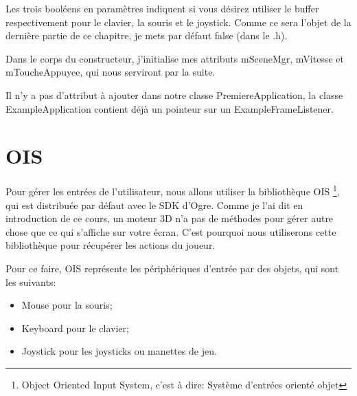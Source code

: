 Les trois bool\'eens en param\`etres indiquent si vous d\'esirez utiliser le buffer respectivement pour le clavier, la souris et le joystick. Comme ce sera l'objet de la derni\`ere partie de ce chapitre, je mets par d\'efaut false (dans le .h).

Dans le corps du constructeur, j'initialise mes attributs mSceneMgr, mVitesse et mToucheAppuyee, qui nous serviront par la suite.

Il n'y a pas d'attribut \`{a} ajouter dans notre classe PremiereApplication, la classe ExampleApplication contient d\'ej\`{a} un pointeur sur un ExampleFrameListener.

       




































\section{OIS}


Pour g\'erer les entr\'ees de l'utilisateur, nous allons utiliser la biblioth\`eque OIS \footnote{Object Oriented Input System, c'est \`a dire: Syst\`eme d'entr\'ees orient\'e objet}, qui est distribu\'ee par d\'efaut avec le SDK d'Ogre. Comme je l'ai dit en introduction de ce cours, un moteur 3D n'a pas de m\'ethodes pour g\'erer autre chose que ce qui s'affiche sur votre \'ecran. C'est pourquoi nous utiliserons cette biblioth\`eque pour r\'ecup\'erer les actions du joueur.\newline


Pour ce faire, OIS repr\'esente les p\'eriph\'eriques d'entr\'ee par des objets, qui sont les suivants:

\begin{itemize}
\item Mouse pour la souris;
\item Keyboard pour le clavier;
\item Joystick pour les joysticks ou manettes de jeu.\newline
\end{itemize}
    



